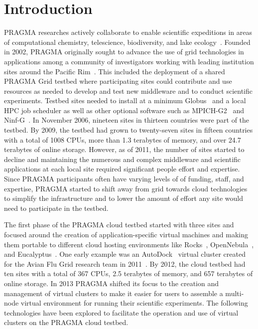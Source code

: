 \documentclass{acm_proc_article-sp}
\begin{document}



\section{Introduction}

PRAGMA researches actively collaborate to enable scientific expeditions in areas of computational chemistry, telescience, biodiversity, and lake ecology~\cite{pragmaWeb}.  Founded in 2002, PRAGMA originally sought to advance the use of grid technologies in applications among a community of investigators working with leading institution sites around the Pacific Rim~\cite{pragmaReport2004}.  This included the deployment of a shared PRAGMA Grid testbed where participating sites could contribute and use resources as needed to develop and test new middleware and to conduct scientific experiments.  Testbed sites needed to install at a minimum Globus~\cite{globus} and a local HPC job scheduler as well as other optional software such as MPICH-G2~\cite{mpichg2} and Ninf-G~\cite{ninfg}.  In November 2006, nineteen sites in thirteen countries were part of the testbed.  By 2009, the testbed had grown to twenty-seven sites in fifteen countries with a total of 1008 CPUs, more than 1.3 terabytes of memory, and over 24.7 terabytes of online storage.  However, as of 2011, the number of sites started to decline and maintaining the numerous and complex middleware and scientific applications at each local site required significant people effort and expertise.  Since PRAGMA participants often have varying levels of of funding, staff, and expertise, PRAGMA started to shift away from grid towards cloud technologies to simplify the infrastructure and to lower the amount of effort any site would need to participate in the testbed.  

The first phase of the PRAGMA cloud testbed started with three sites and focused around the creation of application-specific virtual machines and making them portable to  different cloud hosting environments like Rocks~\cite{rocks}, OpenNebula~\cite{opennebula}, and Eucalyptus~\cite{eucalyptus}.
One early example was an AutoDock~\cite{autodock} virtual cluster created for the Avian Flu Grid research team in 2011~\cite{pragmaReport2011}.   By 2012, the cloud testbed had ten sites with a total of 367 CPUs, 2.5 terabytes of memory, and 657 terabytes of online storage.  In 2013 PRAGMA shifted its  focus to the creation and management of virtual clusters to make it easier for users to assemble a multi-node virtual environment for running their scientific experiments.  The following technologies have been explored to facilitate the operation and use of virtual clusters on the PRAGMA cloud testbed.
\end{document}
